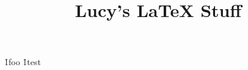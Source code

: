 \begin{html}
    \begin{head}
        \title{Lucy's LaTeX Stuff}
    \end{head}

    \begin{body}
     \h1{foo}
     \h1{test}
    \end{body}
\end{html}